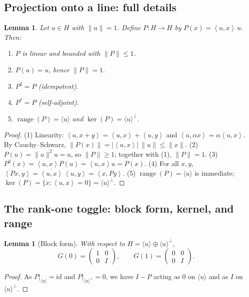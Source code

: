 \documentclass[11pt]{article}
\newtheorem{lemma}[theorem]{Lemma}
\theoremstyle{definition}
\newcommand{\ip}[2]{\left\langle #1,#2\right\rangle}
\DeclareMathOperator{\range}{range}
\DeclareMathOperator{\kerop}{ker}
\begin{document}
\subsection{Projection onto a line: full details}

\begin{lemma}\label{lem:proj-details}
Let $u\in H$ with $\|u\|=1$. Define $P:H\to H$ by $P(x)=\ip{u}{x}\,u$. Then:
\begin{enumerate}
\item $P$ is linear and bounded with $\|P\|\le 1$.
\item $P(u)=u$, hence $\|P\|=1$.
\item $P^2=P$ (idempotent).
\item $P^\ast=P$ (self-adjoint).
\item $\range(P)=\langle u\rangle$ and $\kerop(P)=\langle u\rangle^\perp$.
\end{enumerate}
\end{lemma}

\begin{proof}
(1) Linearity: $\ip{u}{x+y}=\ip{u}{x}+\ip{u}{y}$ and $\ip{u}{\alpha x}=\alpha\ip{u}{x}$. By Cauchy--Schwarz,
$\|P(x)\|=|\ip{u}{x}|\,\|u\|\le \|x\|$.
(2) $P(u)=\|u\|^2u=u$, so $\|P\|\ge 1$; together with (1), $\|P\|=1$.
(3) $P^2(x)=\ip{u}{x}P(u)=\ip{u}{x}u=P(x)$.
(4) For all $x,y$, $\ip{Px}{y}=\overline{\ip{u}{x}}\,\ip{u}{y}=\ip{x}{Py}$.
(5) $\range(P)=\langle u\rangle$ is immediate; $\kerop(P)=\{x:\ip{u}{x}=0\}=\langle u\rangle^\perp$.
\end{proof}

\subsection{The rank-one toggle: block form, kernel, and range}

\begin{lemma}[Block form]\label{lem:block-human}
With respect to $H=\langle u\rangle\oplus \langle u\rangle^\perp$,
\[
G(0)=\begin{pmatrix}1&0\\[2pt]0&I\end{pmatrix},\qquad
G(1)=\begin{pmatrix}0&0\\[2pt]0&I\end{pmatrix}.
\]
\end{lemma}

\begin{proof}
As $P|_{\langle u\rangle}=\mathrm{id}$ and $P|_{\langle u\rangle^\perp}=0$, we have $I-P$ acting as $0$ on $\langle u\rangle$ and as $I$ on $\langle u\rangle^\perp$.
\end{proof}
\end{document}
